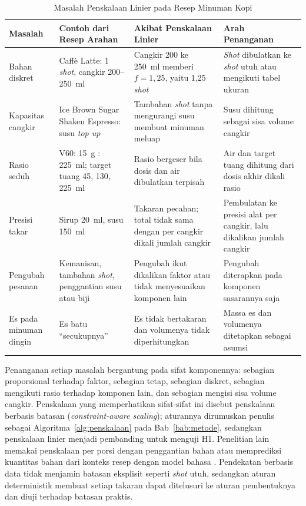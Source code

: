 \begin{table}[!htb]
\centering
\caption{Masalah Penskalaan Linier pada Resep Minuman Kopi}
\label{tab:masalah-penskalaan}
{\small
{}
\begin{tabular}{@{}>{\raggedright\arraybackslash}p{2.3cm}>{\raggedright\arraybackslash}p{3.4cm}>{\raggedright\arraybackslash}p{3.7cm}>{\raggedright\arraybackslash}p{3.6cm}@{}}
\toprule
\textbf{Masalah} & \textbf{Contoh dari Resep Arahan} & \textbf{Akibat Penskalaan Linier} & \textbf{Arah Penanganan} \\
\midrule
Bahan diskret & Caffè Latte: 1 \textit{shot}, cangkir 200--250~ml & Cangkir 200 ke 250~ml memberi $f = 1{,}25$, yaitu 1,25 \textit{shot} & \textit{Shot} dibulatkan ke \textit{shot} utuh atau mengikuti tabel ukuran \\
\addlinespace
Kapasitas cangkir & Ice Brown Sugar Shaken Espresso: susu \textit{top up} & Tambahan \textit{shot} tanpa mengurangi susu membuat minuman meluap & Susu dihitung sebagai sisa volume cangkir \\
\addlinespace
Rasio seduh & V60: 15~g : 225~ml; target tuang 45, 130, 225~ml & Rasio bergeser bila dosis dan air dibulatkan terpisah & Air dan target tuang dihitung dari dosis akhir dikali rasio \\
\addlinespace
Presisi takar & Sirup 20~ml, susu 150~ml & Takaran pecahan; total tidak sama dengan per cangkir dikali jumlah cangkir & Pembulatan ke presisi alat per cangkir, lalu dikalikan jumlah cangkir \\
\addlinespace
Pengubah pesanan & Kemanisan, tambahan \textit{shot}, penggantian susu atau biji & Pengubah ikut dikalikan faktor atau tidak menyesuaikan komponen lain & Pengubah diterapkan pada komponen sasarannya saja \\
\addlinespace
Es pada minuman dingin & Es batu ``secukupnya'' & Es tidak bertakaran dan volumenya tidak diperhitungkan & Massa es dan volumenya ditetapkan sebagai asumsi \\
\bottomrule
\end{tabular}}
\end{table}

Penanganan setiap masalah bergantung pada sifat komponennya: sebagian proporsional terhadap faktor, sebagian tetap, sebagian diskret, sebagian mengikuti rasio terhadap komponen lain, dan sebagian mengisi sisa volume cangkir. Penskalaan yang memperhatikan sifat-sifat ini disebut penskalaan berbasis batasan (\textit{constraint-aware scaling}); aturannya dirumuskan penulis sebagai Algoritma~\ref{alg:penskalaan} pada Bab~\ref{bab:metode}, sedangkan penskalaan linier menjadi pembanding untuk menguji H1. Penelitian lain memakai penskalaan per porsi dengan penggantian bahan \citep*{benita2026web} atau memprediksi kuantitas bahan dari konteks resep dengan model bahasa \citep{choi2023kitchenscale}. Pendekatan berbasis data tidak menjamin batasan eksplisit seperti \textit{shot} utuh, sedangkan aturan deterministik membuat setiap takaran dapat ditelusuri ke aturan pembentuknya dan diuji terhadap batasan praktis.

